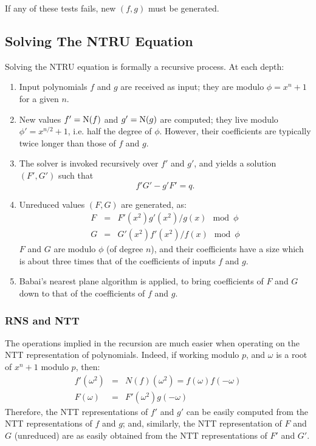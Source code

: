 If any of these tests fails, new $(f,g)$ must be generated.

\subsection{Solving The NTRU Equation}

Solving the NTRU equation is formally a recursive process. At each
depth:
\begin{enumerate}

  \item Input polynomials $f$ and $g$ are received as input; they
  are modulo $\phi = x^n+1$ for a given $n$.

  \item New values $f' = \operatorname{N}(f)$ and $g' = \operatorname{N}(g)$ are computed;
  they live modulo $\phi' = x^{n/2}+1$, i.e. half the degree of $\phi$.
  However, their coefficients are typically twice longer than those of $f$ and $g$.

  \item The solver is invoked recursively over $f'$ and $g'$, and yields
  a solution $(F',G')$ such that $$f'G'-g'F' = q.$$

  \item Unreduced values $(F,G)$ are generated, as:
  \begin{equation}
    \begin{array}{rcl}
      F &=& F'(x^2)g'(x^2)/g(x) \mod \phi \\
      G &=& G'(x^2)f'(x^2)/f(x) \mod \phi
    \end{array}
  \end{equation}
  $F$ and $G$ are modulo $\phi$ (of degree $n$), and their coefficients
  have a size which is about three times that of the coefficients of
  inputs $f$ and $g$.

  \item Babai's nearest plane algorithm is applied, to bring coefficients
  of $F$ and $G$ down to that of the coefficients of $f$ and $g$.

\end{enumerate}

\subsubsection{RNS and NTT}

The operations implied in the recursion are much easier when operating
on the NTT representation of polynomials. Indeed, if working modulo $p$,
and $\omega$ is a root of $x^n+1$ modulo $p$, then:
\begin{equation}
  \begin{array}{rcl}
    f'(\omega^2) &=& N(f)(\omega^2) = f(\omega) f(-\omega) \\
    F(\omega) &=& F'(\omega^2) g(-\omega)
  \end{array}
\end{equation}
Therefore, the NTT representations of $f'$ and $g'$ can be easily computed
from the NTT representations of $f$ and $g$; and, similarly, the NTT
representation of $F$ and $G$ (unreduced) are as easily obtained from
the NTT representations of $F'$ and $G'$.

